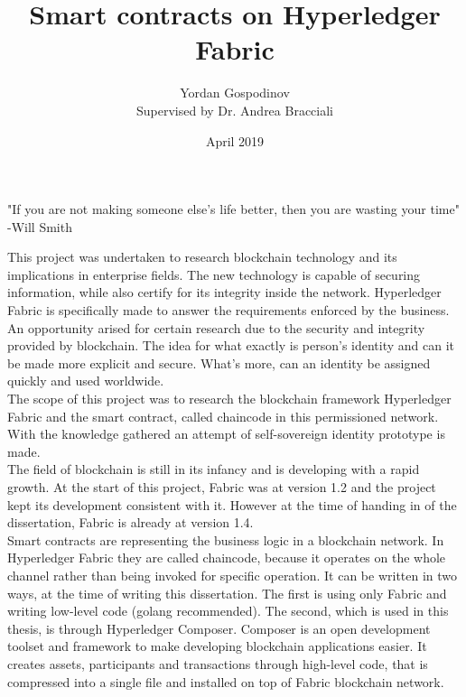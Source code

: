 \documentclass[a4paper,11pt]{report}
\title{Smart contracts on Hyperledger Fabric}
\author{
{Yordan Gospodinov} \\
{\small{Supervised by Dr. Andrea Bracciali}}
}
\date{April 2019}
\begin{document}
\maketitle				




\begin{center}
\Huge "If you are not making someone else's life better, then you are wasting your time" -Will Smith
\end{center}

\clearpage    



  This project was undertaken to research blockchain technology and its implications in enterprise fields. The new technology is capable of securing information, while also certify for its integrity inside the network. Hyperledger Fabric is specifically made to answer the requirements enforced by the business.  
\\  

  An opportunity arised for certain research due to the security and integrity provided by blockchain. The idea for what exactly is person’s identity and can it be made more explicit and secure. What's more, can an identity be assigned quickly and used worldwide.
\\

	The scope of this project was to research the blockchain framework Hyperledger Fabric and the smart contract, called chaincode in this permissioned network. With the knowledge gathered an attempt of self-sovereign identity prototype is made.
\\
 
	The field of blockchain is still in its infancy and is developing with a rapid growth. At the start of this project, Fabric was at version 1.2 and the project kept its development consistent with it. However at the time of handing in of the dissertation, Fabric is already at version 1.4. 
\\

	Smart contracts are representing the business logic in a blockchain network. In Hyperledger Fabric they are called chaincode, because it operates on the whole channel rather than being invoked for specific operation. It can be written in two ways, at the time of writing this dissertation. The first is using only Fabric and writing low-level code (golang recommended). The second, which is used in this thesis, is through Hyperledger Composer. Composer is an open development toolset and framework to make developing blockchain applications easier. It creates assets, participants and transactions through high-level code, that is compressed into a single file and installed on top of Fabric blockchain network. 
\end{document}
